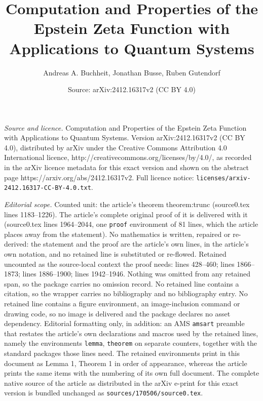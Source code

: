 \documentclass[10pt,a4paper]{amsart}
\title{Computation and Properties of the Epstein Zeta Function with Applications to Quantum Systems}
\author{Andreas A. Buchheit, Jonathan Busse, Ruben Gutendorf}
\date{Source: arXiv:2412.16317v2 (CC BY 4.0)}
\begin{document}
\maketitle

\noindent\emph{Source and licence.} Computation and Properties of the Epstein Zeta Function with Applications to Quantum Systems. Version arXiv:2412.16317v2 (CC BY 4.0), distributed by arXiv under the Creative Commons Attribution 4.0 International licence, http://creativecommons.org/licenses/by/4.0/, as recorded in the arXiv licence metadata for this exact version and shown on the abstract page https://arxiv.org/abs/2412.16317v2. Full licence notice: \texttt{licenses/arxiv-2412.16317-CC-BY-4.0.txt}.\par\smallskip

\noindent\textit{Editorial scope.} Counted unit: the article's theorem theorem:trunc (source0.tex lines 1183--1226). The article's complete original proof of it is delivered with it (source0.tex lines 1964--2044, one \texttt{proof} environment of 81 lines, which the article places away from the statement). No mathematics is written, repaired or re-derived: the statement and the proof are the article's own lines, in the article's own notation, and no retained line is substituted or re-flowed.  Retained uncounted as the source-local context the proof needs: lines 428--460; lines 1866--1873; lines 1886--1900; lines 1942--1946.  Nothing was omitted from any retained span, so the package carries no omission record.  No retained line contains a citation, so the wrapper carries no bibliography and no bibliography entry.  No retained line contains a figure environment, an image-inclusion command or drawing code, so no image is delivered and the package declares no asset dependency.  Editorial formatting only, in addition: an AMS \texttt{amsart} preamble that restates the article's own declarations and macros used by the retained lines, namely the environments \texttt{lemma}, \texttt{theorem} on separate counters, together with the standard packages those lines need.  The retained environments print in this document as Lemma 1, Theorem 1 in order of appearance, whereas the article prints the same items with the numbering of its own full document.  The complete native source of the article as distributed in the arXiv e-print for this exact version is bundled unchanged as \texttt{sources/170506/source0.tex}.
\end{document}
